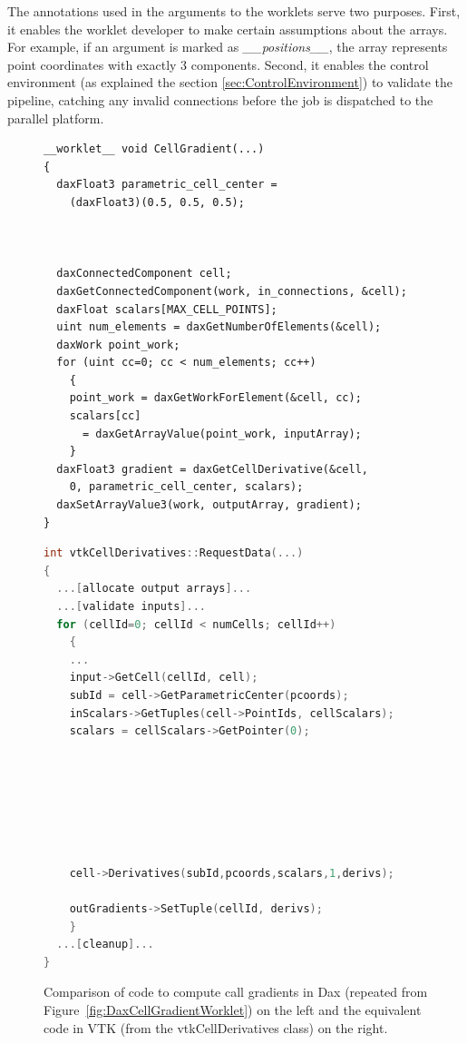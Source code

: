 \documentclass{vgtc}                          %
\begin{document}
The annotations used in the arguments to the worklets serve two purposes.
First, it enables the worklet developer to make certain assumptions about
the arrays. For example, if an argument is marked as \emph{\_\_positions\_\_}, the
array represents point coordinates with exactly 3 components.
Second, it enables the control environment (as explained the section \ref{sec:ControlEnvironment}) to validate
the pipeline, catching any invalid connections before the job is dispatched to
the parallel platform.

\begin{figure}
  \centering
  \begin{minipage}[t]{.49\linewidth}
    \begin{lstlisting}[language=Dax]
__worklet__ void CellGradient(...)
{
  daxFloat3 parametric_cell_center =
    (daxFloat3)(0.5, 0.5, 0.5);



  daxConnectedComponent cell;
  daxGetConnectedComponent(work, in_connections, &cell);
  daxFloat scalars[MAX_CELL_POINTS];
  uint num_elements = daxGetNumberOfElements(&cell);
  daxWork point_work;
  for (uint cc=0; cc < num_elements; cc++)
    {
    point_work = daxGetWorkForElement(&cell, cc);
    scalars[cc]
      = daxGetArrayValue(point_work, inputArray);
    }
  daxFloat3 gradient = daxGetCellDerivative(&cell,
    0, parametric_cell_center, scalars);
  daxSetArrayValue3(work, outputArray, gradient);
}
    \end{lstlisting}
  \end{minipage}
  \begin{minipage}[t]{.49\linewidth}
    \begin{lstlisting}[language=C++]
int vtkCellDerivatives::RequestData(...)
{
  ...[allocate output arrays]...
  ...[validate inputs]...
  for (cellId=0; cellId < numCells; cellId++)
    {
    ...
    input->GetCell(cellId, cell);
    subId = cell->GetParametricCenter(pcoords);
    inScalars->GetTuples(cell->PointIds, cellScalars);
    scalars = cellScalars->GetPointer(0);







    cell->Derivatives(subId,pcoords,scalars,1,derivs);

    outGradients->SetTuple(cellId, derivs);
    }
  ...[cleanup]...
}
    \end{lstlisting}
  \end{minipage}
  \caption{Comparison of code to compute call gradients in Dax (repeated
    from Figure~\ref{fig:DaxCellGradientWorklet}) on the left and the
    equivalent code in VTK (from the vtkCellDerivatives class) on the
    right.}
  \label{fig:DaxVTKCompare}
\end{figure}
\end{document}
